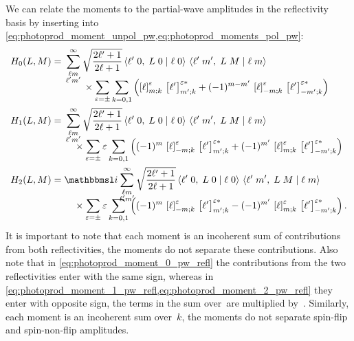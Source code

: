 We can relate the moments to the partial-wave amplitudes in the
reflectivity basis by inserting
 into
\cref{eq:photoprod_moment_unpol_pw,eq:photoprod_moments_pol_pw}:
\begin{align}
  \label{eq:photoprod_moment_0_pw_refl}
  H_0(L, M)
  ={}& \begin{multlined}[t][0.8\columnwidth]
    \sum_{\substack{\ell m \\ \ell' m'}}^\infty \sqrt{\frac{2 \ell' + 1}{2 \ell + 1}}
    \clebsch{\ell'}{0}{L}{0}{\ell}{0}\, \clebsch{\ell'}{m'}{L}{M}{\ell}{m}
    \\[-2ex]
    \shoveleft{\hfill \times%
      \sum_{\refl = \pm} \sum_{k = 0, 1} \rBrk[2]{\sBrk{\ell}^\refl_{m; k}\, \sBrk{\ell'}^{\refl *}_{m'; k}
      + (-1)^{m - m'}\, \sBrk{\ell}^\refl_{{-m}; k}\, \sBrk{\ell'}^{\refl *}_{{-m'}; k}}
    }
  \end{multlined}
  \\
  \label{eq:photoprod_moment_1_pw_refl}
  H_1(L, M)
  ={}& \begin{multlined}[t][0.8\columnwidth]
    \sum_{\substack{\ell m \\ \ell' m'}}^\infty \sqrt{\frac{2 \ell' + 1}{2 \ell + 1}}
    \clebsch{\ell'}{0}{L}{0}{\ell}{0}\, \clebsch{\ell'}{m'}{L}{M}{\ell}{m}
    \\[-2ex]
    \shoveleft{\hfill \times%
      \sum_{\refl = \pm} \refl \sum_{k = 0, 1} \rBrk[2]{(-1)^m\, \sBrk{\ell}^\refl_{{-m}; k}\, \sBrk{\ell'}^{\refl *}_{m'; k}
      + (-1)^{m'}\, \sBrk{\ell}^\refl_{m; k}\, \sBrk{\ell'}^{\refl *}_{{-m'}; k}}
    }
  \end{multlined}
  \\
  \label{eq:photoprod_moment_2_pw_refl}
  H_2(L, M)
  ={}& \begin{multlined}[t][0.8\columnwidth]
    \imag \sum_{\substack{\ell m \\ \ell' m'}}^\infty \sqrt{\frac{2 \ell' + 1}{2 \ell + 1}}
    \clebsch{\ell'}{0}{L}{0}{\ell}{0}\, \clebsch{\ell'}{m'}{L}{M}{\ell}{m}
    \\[-2ex]
    \shoveleft{\hfill \times%
      \sum_{\refl = \pm} \refl \sum_{k = 0, 1} \rBrk[2]{(-1)^m\, \sBrk{\ell}^\refl_{{-m}; k}\, \sBrk{\ell'}^{\refl *}_{m'; k}
      - (-1)^{m'}\, \sBrk{\ell}^\refl_{m; k}\, \sBrk{\ell'}^{\refl *}_{{-m'}; k}}
    }.
  \end{multlined}
\end{align}
It is important to note that each moment is an incoherent sum of
contributions from both reflectivities, \ie the moments do not
separate these contributions.  Also note that in
\cref{eq:photoprod_moment_0_pw_refl} the contributions from the two
reflectivities enter with the same sign, whereas in
\cref{eq:photoprod_moment_1_pw_refl,eq:photoprod_moment_2_pw_refl}
they enter with opposite sign, \ie the terms in the sum over~ are
multiplied by~.  Similarly, each moment is an incoherent sum
over~$k$, \ie the moments do not separate spin-flip and spin-non-flip
amplitudes.

